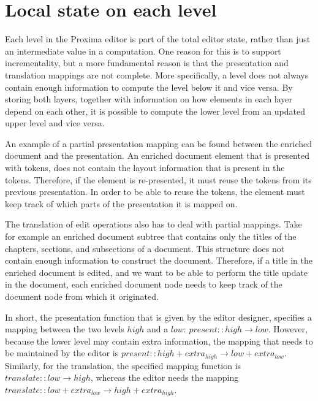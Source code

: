 \section{Local state on each level}

Each level in the Proxima editor is part of the total editor state, rather than just an intermediate value in a computation. One reason for this is to support incrementality, but a more fundamental reason is that the presentation and translation mappings are not complete. More specifically, a level does not always contain enough information to compute the level below it and vice versa. By storing both layers, together with information on how elements in each layer depend on each other, it is possible to compute the lower level from an updated upper level and vice versa.

An example of a partial presentation mapping can be found between the enriched document and the presentation. An enriched document element that is presented with tokens, does not contain the layout information that is present in the tokens. Therefore, if the element is re-presented, it must reuse the tokens from its previous presentation. In order to be able to reuse the tokens, the element must keep track of which parts of the presentation it is mapped on.

The translation of edit operations also has to deal with partial mappings. Take for example an enriched document subtree that contains only the titles of the chapters, sections, and subsections of a document. This structure does not contain enough information to construct the document. Therefore, if a title in the enriched document is edited, and we want to be able to perform the title update in the document, each enriched document node needs to keep track of the document node from which it originated. 

In short, the presentation function that is given by the editor designer, specifies a mapping between the two levels $high$ and a $low$:  $present :: high \rightarrow low$. However, because the lower level may contain extra information, the mapping that needs to be maintained by the editor is 
$present :: high+extra_{high} \rightarrow low+extra_{low}$. Similarly, for the translation, the specified mapping function is 
$translate :: low \rightarrow high$, whereas the editor needs the mapping 
$translate :: low+extra_{low} \rightarrow high+extra_{high}$. 

